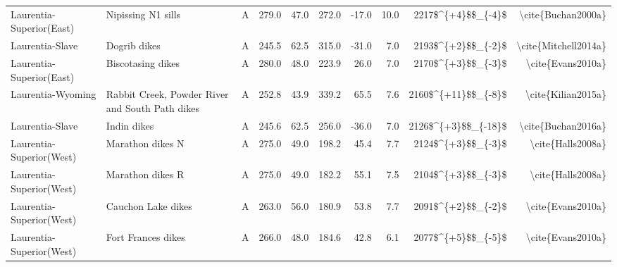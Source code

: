 \begin{longtable}{p{1 in}p{1 in}rrrrrrrr}
      Laurentia-Superior(East) &                                 Nipissing N1 sills &      A &     279.0 &      47.0 & 272.0 & -17.0 &      10.0 &     2217\$\textasciicircum \{+4\}\$\$\_\{-4\}\$ &                                 \textbackslash cite\{Buchan2000a\} \\
               Laurentia-Slave &                                       Dogrib dikes &      A &     245.5 &      62.5 & 315.0 & -31.0 &       7.0 &     2193\$\textasciicircum \{+2\}\$\$\_\{-2\}\$ &                               \textbackslash cite\{Mitchell2014a\} \\
      Laurentia-Superior(East) &                                  Biscotasing dikes &      A &     280.0 &      48.0 & 223.9 &  26.0 &       7.0 &     2170\$\textasciicircum \{+3\}\$\$\_\{-3\}\$ &                                  \textbackslash cite\{Evans2010a\} \\
             Laurentia-Wyoming &    Rabbit Creek, Powder River and South Path dikes &      A &     252.8 &      43.9 & 339.2 &  65.5 &       7.6 &    2160\$\textasciicircum \{+11\}\$\$\_\{-8\}\$ &                                 \textbackslash cite\{Kilian2015a\} \\
               Laurentia-Slave &                                        Indin dikes &      A &     245.6 &      62.5 & 256.0 & -36.0 &       7.0 &    2126\$\textasciicircum \{+3\}\$\$\_\{-18\}\$ &                                 \textbackslash cite\{Buchan2016a\} \\
      Laurentia-Superior(West) &                                   Marathon dikes N &      A &     275.0 &      49.0 & 198.2 &  45.4 &       7.7 &     2124\$\textasciicircum \{+3\}\$\$\_\{-3\}\$ &                                  \textbackslash cite\{Halls2008a\} \\
      Laurentia-Superior(West) &                                   Marathon dikes R &      A &     275.0 &      49.0 & 182.2 &  55.1 &       7.5 &     2104\$\textasciicircum \{+3\}\$\$\_\{-3\}\$ &                                  \textbackslash cite\{Halls2008a\} \\
      Laurentia-Superior(West) &                                 Cauchon Lake dikes &      A &     263.0 &      56.0 & 180.9 &  53.8 &       7.7 &     2091\$\textasciicircum \{+2\}\$\$\_\{-2\}\$ &                                  \textbackslash cite\{Evans2010a\} \\
      Laurentia-Superior(West) &                                 Fort Frances dikes &      A &     266.0 &      48.0 & 184.6 &  42.8 &       6.1 &     2077\$\textasciicircum \{+5\}\$\$\_\{-5\}\$ &                                  \textbackslash cite\{Evans2010a\} \\

\end{longtable}
